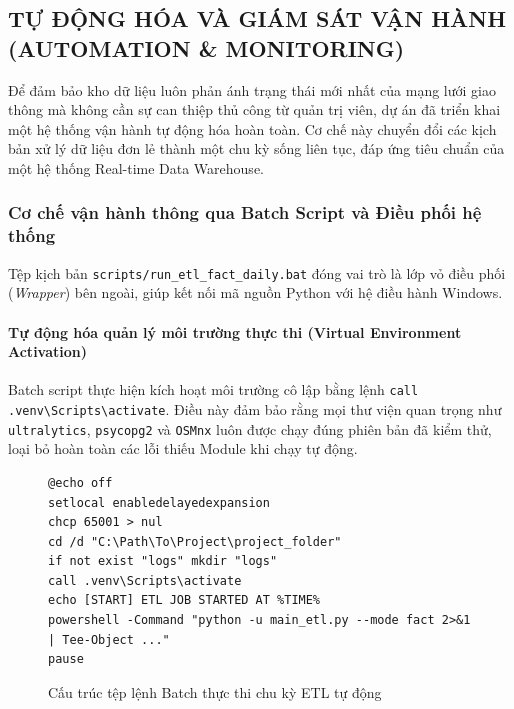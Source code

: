 \subsection{TỰ ĐỘNG HÓA VÀ GIÁM SÁT VẬN HÀNH (AUTOMATION \& MONITORING)}

Để đảm bảo kho dữ liệu luôn phản ánh trạng thái mới nhất của mạng lưới giao thông mà không cần sự can thiệp thủ công từ quản trị viên, dự án đã triển khai một hệ thống vận hành tự động hóa hoàn toàn. Cơ chế này chuyển đổi các kịch bản xử lý dữ liệu đơn lẻ thành một chu kỳ sống liên tục, đáp ứng tiêu chuẩn của một hệ thống Real-time Data Warehouse.

\subsubsection{ Cơ chế vận hành thông qua Batch Script và Điều phối hệ thống}

Tệp kịch bản \texttt{scripts/run\_etl\_fact\_daily.bat} đóng vai trò là lớp vỏ điều phối (\textit{Wrapper}) bên ngoài, giúp kết nối mã nguồn Python với hệ điều hành Windows.

\paragraph{ Tự động hóa quản lý môi trường thực thi (Virtual Environment Activation)}

Batch script thực hiện kích hoạt môi trường cô lập bằng lệnh \texttt{call .venv\textbackslash Scripts\textbackslash activate}. Điều này đảm bảo rằng mọi thư viện quan trọng như \texttt{ultralytics}, \texttt{psycopg2} và \texttt{OSMnx} luôn được chạy đúng phiên bản đã kiểm thử, loại bỏ hoàn toàn các lỗi thiếu Module khi chạy tự động.

\begin{figure}[htbp]
\centering
\begin{minipage}{0.9\textwidth}
\begin{verbatim}
@echo off
setlocal enabledelayedexpansion
chcp 65001 > nul
cd /d "C:\Path\To\Project\project_folder"
if not exist "logs" mkdir "logs"
call .venv\Scripts\activate
echo [START] ETL JOB STARTED AT %TIME%
powershell -Command "python -u main_etl.py --mode fact 2>&1 | Tee-Object ..."
pause
\end{verbatim}
\end{minipage}
\vspace{6mm}
\caption{Cấu trúc tệp lệnh Batch thực thi chu kỳ ETL tự động}
\label{fig:etl_26}
\end{figure}

